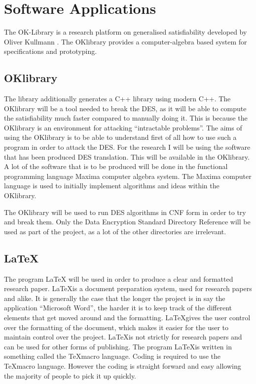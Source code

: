 \documentclass[11pt,a4paper]{report}
\begin{document}
\chapter{Software Applications}
\label{cha:softApp}

The OK-Library is a research platform on generalised satisfiability developed by Oliver Kullmann \cite{Oliver2013OKlibrary}. The OKlibrary provides a computer-algebra based system for specifications and prototyping.

\section{OKlibrary}
\label{sec:OKl}
The library additionally generates a C++ library using modern C++.
The OKlibrary will be a tool needed to break the DES, as it will be able to compute the satisfiability much faster compared to manually doing it. This is because the OKlibrary is an environment for attacking “intractable problems”. The aims of using the OKlibrary is to be able to understand first of all how to use such a program in order to attack the DES.
For the research I will be using the software that has been produced DES translation. This will be available in the OKlibrary. A lot of the software that is to be produced will be done in the functional programming language Maxima computer algebra system. The Maxima computer language is used to initially implement algorithms and ideas within the OKlibrary.

The OKlibrary will be used to run DES algorithms in CNF form in order to try and break them. Only the Data Encryption Standard Directory Reference will be used as part of the project, as a lot of the other directories are irrelevant.



\section{ \LaTeX}
\label{sec:LaTeX}
The program LaTeX will be used in order to produce a clear and formatted research paper. \LaTeX\space is a document preparation system, used for research papers and alike. It is generally the case that the longer the project is in say the application “Microsoft Word”, the harder it is to keep track of the different elements that get moved around and the formatting. \LaTeX\space gives the user control over the formatting of the document, which makes it easier for the user to maintain control over the project. \LaTeX\space is not strictly for research papers and can be used for other forms of publishing. The program \LaTeX\space is written in something called the \TeX\space macro language. Coding is required to use the \TeX\space macro language. However the coding is straight forward and easy allowing the majority of people to pick it up quickly.
\end{document}
